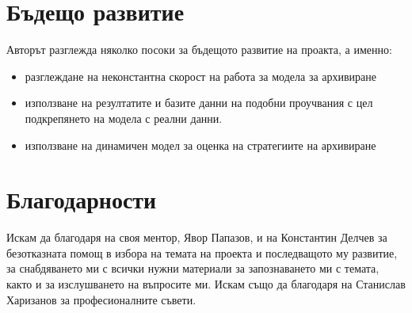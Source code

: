 \documentclass[11pt, a4paper]{article}
\theoremstyle{definition}
\begin{document}
	\section{Бъдещо развитие}
		Авторът разглежда няколко посоки за бъдещото развитие на проакта, а именно:
		\begin{itemize}
			\item разглеждане на неконстантна скорост на работа за модела за архивиране
			\item използване на резултатите и базите данни на подобни проучвания с цел подкрепянето на модела с реални данни.\cite{paquet2019ransomware}
			\item използване на динамичен модел за оценка на стратегиите на архивиране
		\end{itemize}
	\section{Благодарности}
		Искам да благодаря на своя ментор, Явор Папазов, и на Константин Делчев за безотказната помощ в избора на темата на проекта и последващото му развитие, за снабдяването ми с всички нужни материали за запознаването ми с темата, както и за изслушването на въпросите ми. Искам също да благодаря на Станислав Харизанов за професионалните съвети.
\nocite{*}


\end{document}

